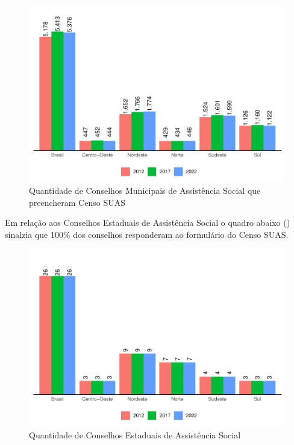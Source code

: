 \documentclass[
  brazilian]{report}
\begin{document}
\begin{figure}
\includegraphics{Censo-SUAS-2022_files/figure-latex/qtd-cmas-1} \caption[Quantidade de Conselhos Municipais de Assistência Social que preencheram Censo SUAS]{Quantidade de Conselhos Municipais de Assistência Social que preencheram Censo SUAS}\label{fig:qtd-cmas}
\end{figure}

Em relação aos Conselhos Estaduais de Assistência Social o quadro abaixo
() sinalzia que 100\% dos conselhos responderam ao
formulário do Censo SUAS.

\begin{figure}
\includegraphics{Censo-SUAS-2022_files/figure-latex/qtd-ceas-1} \caption[Quantidade de Conselhos Estaduais de Assistência Social]{Quantidade de Conselhos Estaduais de Assistência Social}\label{fig:qtd-ceas}
\end{figure}
\end{document}
